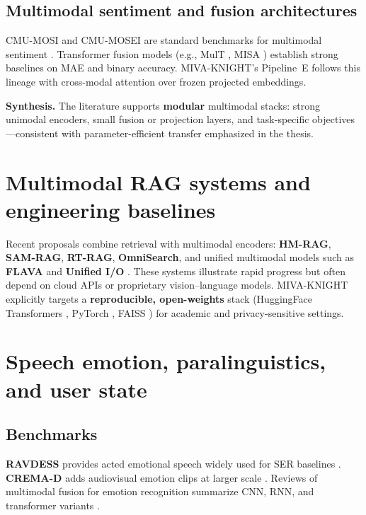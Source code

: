 \documentclass[12pt,a4paper]{article}
\begin{document}
\subsection{Multimodal sentiment and fusion architectures}

CMU-MOSI and CMU-MOSEI are standard benchmarks for multimodal sentiment \cite{zadeh2016mosi,zadeh2018multimodal}. Transformer fusion models (e.g., MulT \cite{tsai2019multimodal}, MISA \cite{hazarika2020misa}) establish strong baselines on MAE and binary accuracy. MIVA-KNIGHT's Pipeline~E follows this lineage with cross-modal attention over frozen projected embeddings.

\textbf{Synthesis.} The literature supports \textbf{modular} multimodal stacks: strong unimodal encoders, small fusion or projection layers, and task-specific objectives---consistent with parameter-efficient transfer emphasized in the thesis.

\section{Multimodal RAG systems and engineering baselines}

Recent proposals combine retrieval with multimodal encoders: \textbf{HM-RAG}, \textbf{SAM-RAG}, \textbf{RT-RAG}, \textbf{OmniSearch}, and unified multimodal models such as \textbf{FLAVA} and \textbf{Unified I/O} \cite{liu2025hmrag,zhai2024samrag,shi2026rtrag,li2024omnisearch,singh2022flava,lu2022unified}. These systems illustrate rapid progress but often depend on cloud APIs or proprietary vision--language models. MIVA-KNIGHT explicitly targets a \textbf{reproducible, open-weights} stack (HuggingFace Transformers \cite{wolf2020transformers}, PyTorch \cite{paszke2019pytorch}, FAISS \cite{johnson2019billion}) for academic and privacy-sensitive settings.

\section{Speech emotion, paralinguistics, and user state}

\subsection{Benchmarks}

\textbf{RAVDESS} provides acted emotional speech widely used for SER baselines \cite{livingstone2018ryerson}. \textbf{CREMA-D} adds audiovisual emotion clips at larger scale \cite{cao2014crema}. Reviews of multimodal fusion for emotion recognition summarize CNN, RNN, and transformer variants \cite{zhang2023multimodal}.
\end{document}
